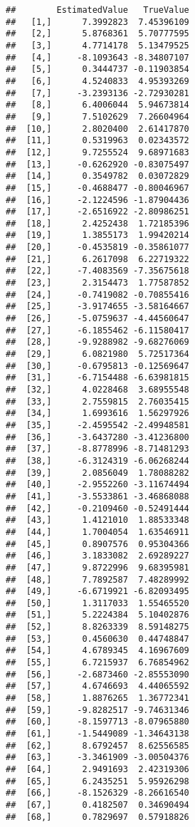 \documentclass[
]{article}
\begin{document}
\begin{verbatim}
##        EstimatedValue   TrueValue
##   [1,]      7.3992823  7.45396109
##   [2,]      5.8768361  5.70777595
##   [3,]      4.7714178  5.13479525
##   [4,]     -8.1093643 -8.34807107
##   [5,]      0.3444737 -0.11903854
##   [6,]      4.5240833  4.95393269
##   [7,]     -3.2393136 -2.72930281
##   [8,]      6.4006044  5.94673814
##   [9,]      7.5102629  7.26604964
##  [10,]      2.8020400  2.61417870
##  [11,]      0.5319963  0.02343572
##  [12,]      9.7255524  9.68971683
##  [13,]     -0.6262920 -0.83075497
##  [14,]      0.3549782  0.03072829
##  [15,]     -0.4688477 -0.80046967
##  [16,]     -2.1224596 -1.87904436
##  [17,]     -2.6516922 -2.80986251
##  [18,]      2.4252438  1.72185396
##  [19,]      1.3855173  1.99420214
##  [20,]     -0.4535819 -0.35861077
##  [21,]      6.2617098  6.22719322
##  [22,]     -7.4083569 -7.35675618
##  [23,]      2.3154473  1.77587852
##  [24,]     -0.7419082 -0.70855416
##  [25,]     -3.9174655 -3.58164667
##  [26,]     -5.0759637 -4.44560647
##  [27,]     -6.1855462 -6.11580417
##  [28,]     -9.9288982 -9.68276069
##  [29,]      6.0821980  5.72517364
##  [30,]     -0.6795813 -0.12569647
##  [31,]     -6.7154488 -6.63981815
##  [32,]      4.0228468  3.68955548
##  [33,]      2.7559815  2.76035415
##  [34,]      1.6993616  1.56297926
##  [35,]     -2.4595542 -2.49948581
##  [36,]     -3.6437280 -3.41236800
##  [37,]     -8.8778996 -8.71481293
##  [38,]     -6.3124319 -6.06268244
##  [39,]      2.0856049  1.78088282
##  [40,]     -2.9552260 -3.11674494
##  [41,]     -3.5533861 -3.46868088
##  [42,]     -0.2109460 -0.52491444
##  [43,]      1.4121010  1.88533348
##  [44,]      1.7004054  1.63546911
##  [45,]      0.8907576  0.95304366
##  [46,]      3.1833082  2.69289227
##  [47,]      9.8722996  9.68395981
##  [48,]      7.7892587  7.48289992
##  [49,]     -6.6719921 -6.82093495
##  [50,]      1.3117033  1.55465520
##  [51,]      5.2224384  5.10402876
##  [52,]      8.8263339  8.59148275
##  [53,]      0.4560630  0.44748847
##  [54,]      4.6789345  4.16967609
##  [55,]      6.7215937  6.76854962
##  [56,]     -2.6873460 -2.85553090
##  [57,]      4.6746693  4.44065592
##  [58,]      1.8876265  1.36772341
##  [59,]     -9.8282517 -9.74631346
##  [60,]     -8.1597713 -8.07965880
##  [61,]     -1.5449089 -1.34643138
##  [62,]      8.6792457  8.62556585
##  [63,]     -3.3461909 -3.00504376
##  [64,]      2.9491693  2.42319306
##  [65,]      6.2435251  5.95926298
##  [66,]     -8.1526329 -8.26616540
##  [67,]      0.4182507  0.34690494
##  [68,]      0.7829697  0.57918826

\end{verbatim}
\end{document}
